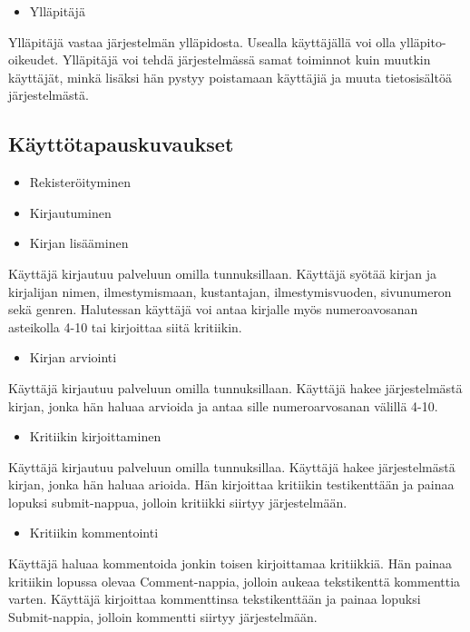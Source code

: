 \documentclass[11pt,oneside,article]{memoir}
\begin{document}
\begin{itemize}
\item Ylläpitäjä
\end{itemize}
Ylläpitäjä vastaa järjestelmän ylläpidosta. Usealla käyttäjällä voi olla ylläpito-oikeudet. Ylläpitäjä voi tehdä järjestelmässä samat toiminnot kuin muutkin käyttäjät, minkä lisäksi hän pystyy poistamaan käyttäjiä ja muuta tietosisältöä järjestelmästä.
\subsection{Käyttötapauskuvaukset}
\label{sec-2-2}

\begin{itemize}
\item Rekisteröityminen
\item Kirjautuminen
\item Kirjan lisääminen
\end{itemize}
Käyttäjä kirjautuu palveluun omilla tunnuksillaan. Käyttäjä syötää kirjan ja kirjalijan nimen, ilmestymismaan, kustantajan, ilmestymisvuoden, sivunumeron sekä genren. Halutessan käyttäjä voi antaa kirjalle myös numeroavosanan asteikolla 4-10 tai kirjoittaa siitä kritiikin.

\begin{itemize}
\item Kirjan arviointi
\end{itemize}
Käyttäjä kirjautuu palveluun omilla tunnuksillaan. Käyttäjä hakee järjestelmästä kirjan, jonka hän haluaa arvioida ja antaa sille numeroarvosanan välillä 4-10.

\begin{itemize}
\item Kritiikin kirjoittaminen
\end{itemize}
Käyttäjä kirjautuu palveluun omilla tunnuksillaa. Käyttäjä hakee järjestelmästä kirjan, jonka hän haluaa arioida. Hän kirjoittaa kritiikin testikenttään ja painaa lopuksi submit-nappua, jolloin kritiikki siirtyy järjestelmään.

\begin{itemize}
\item Kritiikin kommentointi
\end{itemize}
Käyttäjä haluaa kommentoida jonkin toisen kirjoittamaa kritiikkiä. Hän painaa kritiikin lopussa olevaa Comment-nappia, jolloin aukeaa tekstikenttä kommenttia varten. Käyttäjä kirjoittaa kommenttinsa tekstikenttään ja painaa lopuksi Submit-nappia, jolloin kommentti siirtyy järjestelmään.
\end{document}
